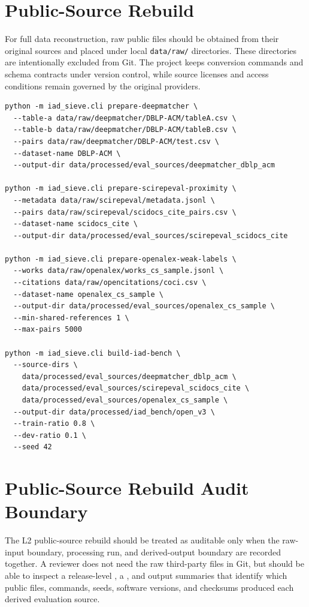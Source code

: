 \documentclass[11pt]{article}
\begin{document}
\section{Public-Source Rebuild}

For full data reconstruction, raw public files should be obtained from their original sources and placed under local \texttt{data/raw/} directories. These directories are intentionally excluded from Git. The project keeps conversion commands and schema contracts under version control, while source licenses and access conditions remain governed by the original providers.

\small
\begin{verbatim}
python -m iad_sieve.cli prepare-deepmatcher \
  --table-a data/raw/deepmatcher/DBLP-ACM/tableA.csv \
  --table-b data/raw/deepmatcher/DBLP-ACM/tableB.csv \
  --pairs data/raw/deepmatcher/DBLP-ACM/test.csv \
  --dataset-name DBLP-ACM \
  --output-dir data/processed/eval_sources/deepmatcher_dblp_acm

python -m iad_sieve.cli prepare-scirepeval-proximity \
  --metadata data/raw/scirepeval/metadata.jsonl \
  --pairs data/raw/scirepeval/scidocs_cite_pairs.csv \
  --dataset-name scidocs_cite \
  --output-dir data/processed/eval_sources/scirepeval_scidocs_cite

python -m iad_sieve.cli prepare-openalex-weak-labels \
  --works data/raw/openalex/works_cs_sample.jsonl \
  --citations data/raw/opencitations/coci.csv \
  --dataset-name openalex_cs_sample \
  --output-dir data/processed/eval_sources/openalex_cs_sample \
  --min-shared-references 1 \
  --max-pairs 5000

python -m iad_sieve.cli build-iad-bench \
  --source-dirs \
    data/processed/eval_sources/deepmatcher_dblp_acm \
    data/processed/eval_sources/scirepeval_scidocs_cite \
    data/processed/eval_sources/openalex_cs_sample \
  --output-dir data/processed/iad_bench/open_v3 \
  --train-ratio 0.8 \
  --dev-ratio 0.1 \
  --seed 42
\end{verbatim}
\normalsize

\section{Public-Source Rebuild Audit Boundary}

The L2 public-source rebuild should be treated as auditable only when the raw-input boundary, processing run, and derived-output boundary are recorded together. A reviewer does not need the raw third-party files in Git, but should be able to inspect a release-level , a , and output summaries that identify which public files, commands, seeds, software versions, and checksums produced each derived evaluation source.
\end{document}
